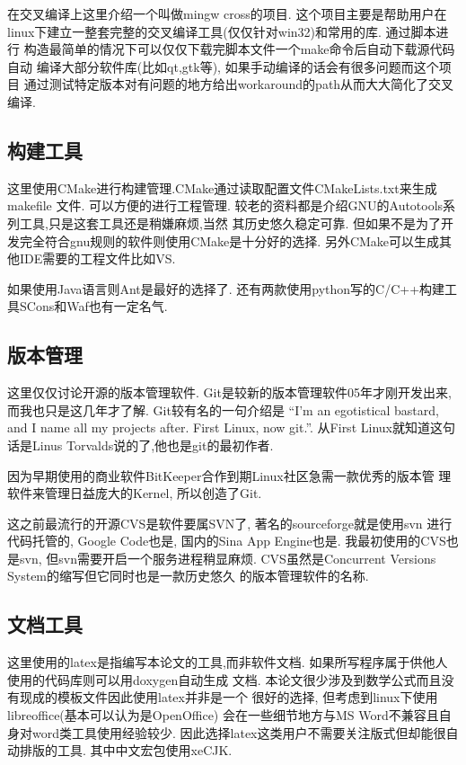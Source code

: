 在交叉编译上这里介绍一个叫做mingw cross的项目. 这个项目主要是帮助用户在
linux下建立一整套完整的交叉编译工具(仅仅针对win32)和常用的库. 通过脚本进行
构造最简单的情况下可以仅仅下载完脚本文件一个make命令后自动下载源代码自动
编译大部分软件库(比如qt,gtk等), 如果手动编译的话会有很多问题而这个项目
通过测试特定版本对有问题的地方给出workaround的path从而大大简化了交叉编译.

\subsection{构建工具}
这里使用CMake进行构建管理.CMake通过读取配置文件CMakeLists.txt来生成makefile
文件. 可以方便的进行工程管理.
较老的资料都是介绍GNU的Autotools系列工具,只是这套工具还是稍嫌麻烦,当然
其历史悠久稳定可靠.
但如果不是为了开发完全符合gnu规则的软件则使用CMake是十分好的选择. 
另外CMake可以生成其他IDE需要的工程文件比如VS.

如果使用Java语言则Ant是最好的选择了.
还有两款使用python写的C/C++构建工具SCons和Waf也有一定名气.

\subsection{版本管理}
这里仅仅讨论开源的版本管理软件.
Git是较新的版本管理软件05年才刚开发出来, 而我也只是这几年才了解.
Git较有名的一句介绍是
``I'm an egotistical bastard, and I name all my projects
after. First Linux, now git.''. 
从First Linux就知道这句话是Linus Torvalds说的了,他也是git的最初作者.

因为早期使用的商业软件BitKeeper合作到期Linux社区急需一款优秀的版本管
理软件来管理日益庞大的Kernel, 所以创造了Git.

这之前最流行的开源CVS是软件要属SVN了, 著名的sourceforge就是使用svn
进行代码托管的, Google Code也是,  国内的Sina App Engine也是.
我最初使用的CVS也是svn, 但svn需要开启一个服务进程稍显麻烦. 
CVS虽然是Concurrent  Versions System的缩写但它同时也是一款历史悠久
的版本管理软件的名称.

\subsection{文档工具}
这里使用的latex是指编写本论文的工具,而非软件文档.
如果所写程序属于供他人使用的代码库则可以用doxygen自动生成
文档.
本论文很少涉及到数学公式而且没有现成的模板文件因此使用latex并非是一个
很好的选择, 但考虑到linux下使用libreoffice(基本可以认为是OpenOffice)
会在一些细节地方与MS Word不兼容且自身对word类工具使用经验较少.
因此选择latex这类用户不需要关注版式但却能很自动排版的工具.
其中中文宏包使用xeCJK.
